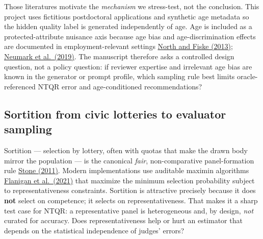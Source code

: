 \documentclass[
]{article}
\begin{document}
Those literatures motivate the \emph{mechanism} we stress-test, not the
conclusion. This project uses fictitious postdoctoral applications and
synthetic age metadata so the hidden quality label is generated
independently of age. Age is included as a protected-attribute nuisance
axis because age bias and age-discrimination effects are documented in
employment-relevant settings
\href{https://doi.org/10.1177/0146167213480043}{North and Fiske (2013)};
\href{https://doi.org/10.1086/701029}{Neumark et al.~(2019)}. The
manuscript therefore asks a controlled design question, not a policy
question: if reviewer expertise and irrelevant age bias are known in the
generator or prompt profile, which sampling rule best limits
oracle-referenced NTQR error and age-conditioned recommendations?

\subsection{Sortition from civic lotteries to evaluator
sampling}\label{sortition-from-civic-lotteries-to-evaluator-sampling}

Sortition --- selection by lottery, often with quotas that make the
drawn body mirror the population --- is the canonical \emph{fair},
non-comparative panel-formation rule
\href{https://doi.org/10.1093/acprof:oso/9780199756100.001.0001}{Stone
(2011)}. Modern implementations use auditable maximin algorithms
\href{https://doi.org/10.1038/s41586-021-03788-6}{Flanigan et
al.~(2021)} that maximize the minimum selection probability subject to
representativeness constraints. Sortition is attractive precisely
because it does \textbf{not} select on competence; it selects on
representativeness. That makes it a sharp test case for NTQR: a
representative panel is heterogeneous and, by design, \emph{not} curated
for accuracy. Does representativeness help or hurt an estimator that
depends on the statistical independence of judges' errors?
\end{document}

